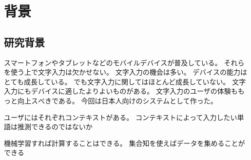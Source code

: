\chapter{背景}
\label{chap:background}

\section{研究背景}

スマートフォンやタブレットなどのモバイルデバイスが普及している。
それらを使う上で文字入力は欠かせない。
文字入力の機会は多い。
デバイスの能力はとても成長している。
でも文字入力に関してはほとんど成長していない。
文字入力にもデバイスに適したよりよいものがある。
文字入力のユーザの体験ももっと向上スべきである。
今回は日本人向けのシステムとして作った。

ユーザにはそれぞれコンテキストがある。
コンテキストによって入力したい単語は推測できるのではないか

機械学習すれば計算することはできる。
集合知を使えばデータを集めることができる
